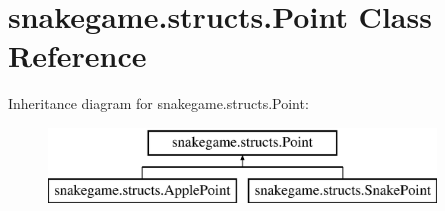 \hypertarget{classsnakegame_1_1structs_1_1_point}{}\section{snakegame.\+structs.\+Point Class Reference}
\label{classsnakegame_1_1structs_1_1_point}
Inheritance diagram for snakegame.\+structs.\+Point\+:\begin{figure}[H]
\begin{center}
\leavevmode
\includegraphics[height=2.000000cm]{classsnakegame_1_1structs_1_1_point}
\end{center}
\end{figure}
